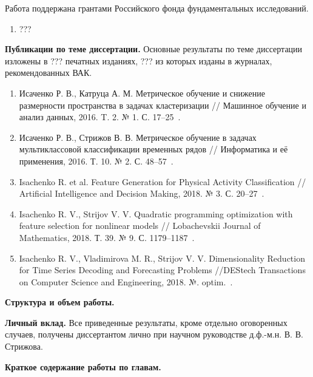 Работа поддержана грантами Российского фонда фундаментальных исследований.
\begin{enumerate}
	\item {\color{red} ???}
\end{enumerate}

\vspace{0.5cm}
\textbf{Публикации по теме диссертации.}
Основные результаты по теме диссертации изложены в  {\color{red} ???} печатных изданиях, {\color{red} ???} из которых изданы в журналах, рекомендованных ВАК.

\begin{enumerate}
	\item Исаченко Р. В., Катруца А. М. Метрическое обучение и снижение размерности пространства в задачах кластеризации // Машинное обучение и анализ данных, 2016. T. 2. № 1. С. 17--25~\cite{isachenko2016metricjmlda}.
	\item Исаченко Р. В., Стрижов В. В. Метрическое обучение в задачах мультиклассовой классификации временных рядов // Информатика и её применения, 2016. Т. 10. № 2. С. 48--57~\cite{isachenko2016metricia}.
	\item Isachenko R. et al. Feature Generation for Physical Activity Classification // Artificial Intelligence and Decision Making, 2018. № 3. С. 20--27~\cite{isachenko2018feature}.
	\item Isachenko R. V., Strijov V. V. Quadratic programming optimization with feature selection for nonlinear models // Lobachevskii Journal of Mathematics, 2018. Т. 39. № 9. С. 1179--1187~\cite{isachenko2018quadratic}.
	\item Isachenko R. V., Vladimirova M. R., Strijov V. V. Dimensionality Reduction for Time Series Decoding and Forecasting Problems //DEStech Transactions on Computer Science and Engineering, 2018. №. optim.~\cite{isachenko2018plsdestech}.
\end{enumerate}

\vspace{0.5cm}
\textbf{Структура и объем работы.}

\vspace{0.5cm}
\textbf{Личный вклад.}
Все приведенные результаты, кроме отдельно оговоренных случаев, получены диссертантом лично при научном руководстве д.ф.-м.н. В. В. Стрижова.

\vspace{0.5cm}
\textbf{Краткое содержание работы по главам.}